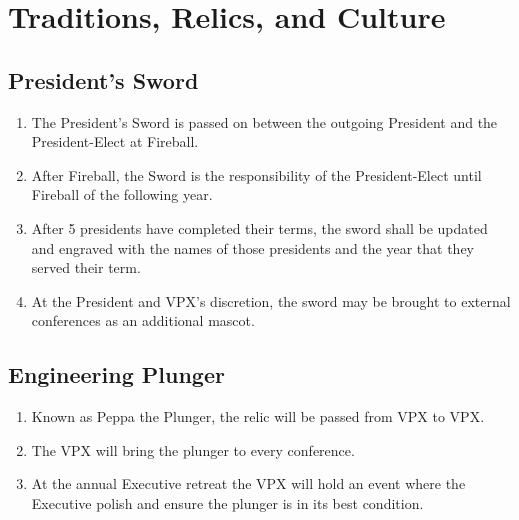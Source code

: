 \section{Traditions, Relics, and Culture}
\label{traditions-relics-and-culture}

\subsection{President's Sword}
\label{presidents-sword}
\begin{enumerate}
 \item
  The President’s Sword is passed on between the outgoing President and the President-Elect at Fireball.
 \item
  After Fireball, the Sword is the responsibility of the President-Elect until Fireball of the following year.
 \item
  After 5 presidents have completed their terms, the sword shall be updated and engraved with the names of those presidents and the year that they served their term.
 \item
  At the President and VPX’s discretion, the sword may be brought to external conferences as an additional mascot.
\end{enumerate}

\subsection{Engineering Plunger}
\label{engineering-plunger}
\begin{enumerate}
 \item
  Known as Peppa the Plunger, the relic will be passed from VPX to VPX.
 \item
  The VPX will bring the plunger to every conference.
 \item
  At the annual Executive retreat the VPX will hold an event where the Executive polish and ensure the plunger is in its best condition.
\end{enumerate}